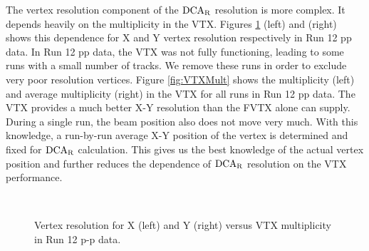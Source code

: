 \documentclass[12pt]{article}
\newcommand{\dcar}{$\rm{DCA}_{R}$ }
\begin{document}
The vertex resolution component of the \dcar resolution is more complex.  It depends heavily on the multiplicity in the VTX.
Figures \ref{fig:DCAResVTXMult} (left) and (right) shows this dependence for X and Y vertex resolution respectively in Run 12 pp data.
In Run 12 pp data, the VTX was not fully functioning, leading to some runs with a small number of tracks.  We remove these runs in order to 
exclude very poor resolution vertices.  Figure \ref{fig:VTXMult} shows the multiplicity (left) and average multiplicity (right) in the VTX for all runs in Run 12 pp data.
The VTX provides a much better X-Y resolution than the FVTX alone can supply.  During a single run, the beam position also does not move very much.
With this knowledge, a run-by-run average X-Y position of the vertex is determined and fixed for \dcar calculation.  This gives us the best knowledge of the 
actual vertex position and further reduces the dependence of \dcar resolution on the VTX performance.


\begin{figure}[t!]
\begin{center}
 \\
  \caption{Vertex resolution for X (left) and Y (right) versus VTX multiplicity in Run 12 p-p data.}
  \label{fig:DCAResVTXMult}
\end{center}
\end{figure}  
\end{document}
